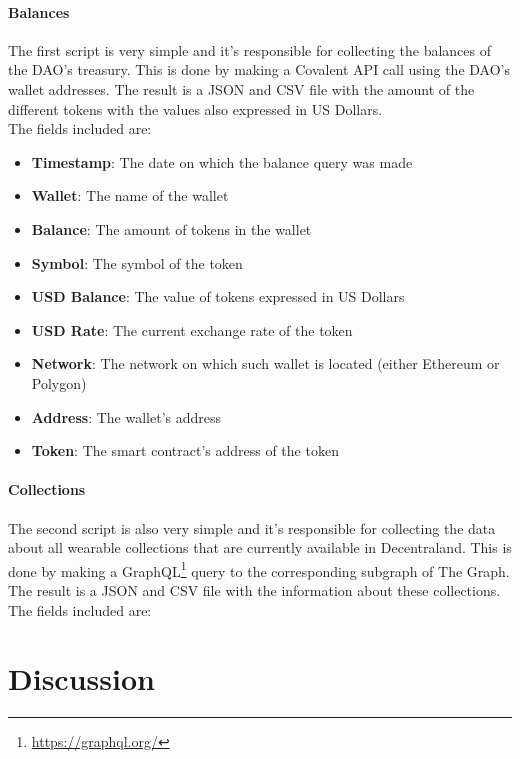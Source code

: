\documentclass[MSE,Master,english]{twbook}%
\begin{document}
\subsubsection{Balances}
The first script is very simple and it's responsible for collecting the balances of the DAO's treasury. This is done by making a Covalent API call using the DAO's wallet addresses. The result is a JSON and CSV file with the amount of the different tokens with the values also expressed in US Dollars. \\

The fields included are:
\begin{itemize}
  \item \textbf{Timestamp}: The date on which the balance query was made
  \item \textbf{Wallet}: The name of the wallet
  \item \textbf{Balance}: The amount of tokens in the wallet
  \item \textbf{Symbol}: The symbol of the token
  \item \textbf{USD Balance}: The value of tokens expressed in US Dollars
  \item \textbf{USD Rate}: The current exchange rate of the token
  \item \textbf{Network}: The network on which such wallet is located (either Ethereum or Polygon)
  \item \textbf{Address}: The wallet's address
  \item \textbf{Token}: The smart contract's address of the token
  
\end{itemize}

\subsubsection{Collections}
The second script is also very simple and it's responsible for collecting the data about all wearable collections that are currently available in Decentraland. This is done by making a GraphQL\footnote{\url{https://graphql.org/}} query to the corresponding subgraph of The Graph. The result is a JSON and CSV file with the information about these collections. \\

The fields included are:

\chapter{Discussion}
\toComplete
\end{document}
